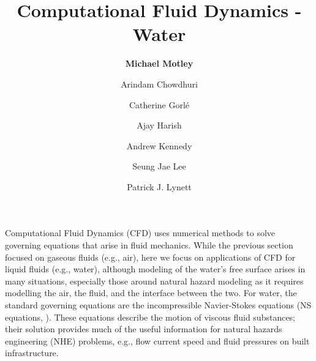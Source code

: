 %
%
%


\title{Computational Fluid Dynamics - Water}
\author{
    \textbf{Michael Motley}
    \and Arindam Chowdhuri
    \and Catherine Gorlé
    \and Ajay Harish
    \and Andrew Kennedy
    \and Seung Jae Lee
    \and Patrick J. Lynett}
\tocauthor{}
%
%
\maketitle

Computational Fluid Dynamics (CFD) uses numerical methods to solve governing equations that arise in fluid mechanics. While the previous section focused on gaseous fluids (e.g., air), here we focus on applications of CFD for liquid fluids (e.g., water), although modeling of the water's free surface arises in many situations, especially those around natural hazard modeling as it requires modelling the air, the fluid, and the interface between the two. For water, the standard governing equations are the incompressible Navier-Stokes equations (NS equations, \citep{Darrigol2005navier}). These equations describe the motion of viscous fluid substances; their solution provides much of the useful information for natural hazards engineering (NHE) problems, e.g., flow current speed and fluid pressures on built infrastructure.

